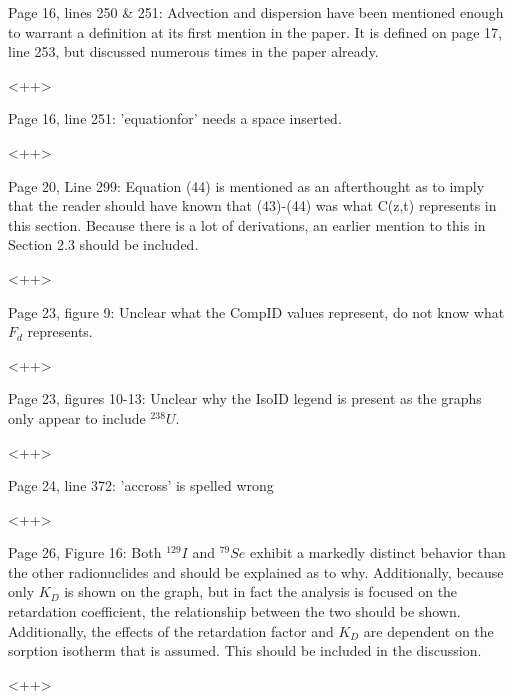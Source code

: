 \documentclass[answers,12pt]{exam}
\begin{document}
\begin{questions}
\question Page  16,  lines  250 \& 251: Advection and dispersion have been mentioned enough to warrant a definition 
at  its  first  mention  in  the  paper.  It  is  defined  on  page  17,  line  253,  but  discussed numerous times in the 
paper already.  
\begin{solution}
<++>
\end{solution} 
 
\question Page 16, line 251: 'equationfor' needs a space inserted.  
\begin{solution}
<++>
\end{solution} 
 
\question Page  20,  Line  299:  Equation (44) is mentioned as an afterthought as to imply that the reader should have 
known  that  (43)-(44)  was  what  C(z,t)  represents  in  this  section.  Because  there  is  a  lot  of  derivations,  an 
earlier mention to this in Section 2.3 should be included.  
\begin{solution}
<++>
\end{solution} 
 
\question 
Page 23, figure 9: Unclear what the CompID values represent, do not know what $F_d$ represents. 
\begin{solution}
<++>
\end{solution} 
 
\question Page  23,  figures  10-13:  Unclear  why  the  IsoID  legend  is  
present  as  the  graphs  only  appear  to  include  $^{238} U$. 
\begin{solution}
<++>
\end{solution} 
 
\question Page 24, line 372: 'accross' is spelled wrong 
\begin{solution}
<++>
\end{solution} 
 
\question Page  26,  Figure  16:  Both  $^{129}I$  and  $^{79}Se$  exhibit  a  markedly  distinct  behavior  than  the  other  radionuclides 
and  should  be  explained  as  to  why.  Additionally,  because  only  
$K_D$ is shown on the graph, but in fact the 
analysis  is  focused  on  the  retardation  coefficient,  the  relationship  between  the  two  should  be  shown. 
Additionally,  the  effects  of  the  retardation  factor  and  $K_D$  are dependent on the sorption isotherm that is 
assumed. This should be included in the discussion.  
\begin{solution}
<++>
\end{solution} 
 


\end{questions}
\end{document}
